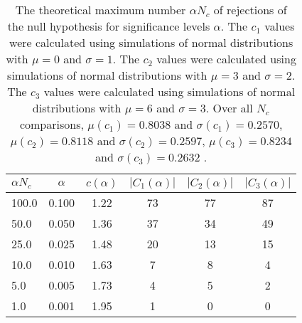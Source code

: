 \begin{table}[h!]
\begin{center}
\begin{tabular}{| l | c | c | c | c | c |}\hline
$\alpha N_c$ & $\alpha$ & $c(\alpha)$ & $|C_1(\alpha)|$ & $|C_2(\alpha)|$ & $|C_3(\alpha)|$ \\\hline
100.0 & 0.100 & 1.22 & 73 & 77 & 87 \\\hline
50.0 & 0.050 & 1.36 & 37 & 34 & 49 \\\hline
25.0 & 0.025 & 1.48 & 20 & 13 & 15 \\\hline
10.0 & 0.010 & 1.63 & 7 & 8 & 4 \\\hline
5.0 & 0.005 & 1.73 & 4 & 5 & 2 \\\hline
1.0 & 0.001 & 1.95 & 1 & 0 & 0 \\\hline
\end{tabular}
\caption{The theoretical maximum number $\alpha N_c$ of rejections
of the null hypothesis for significance levels $\alpha$.
The $c_1$ values were calculated using simulations of normal distributions with $\mu=0$ and $\sigma=1$.
The $c_2$ values were calculated using simulations of normal distributions with $\mu=3$ and $\sigma=2$.
The $c_3$ values were calculated using simulations of normal distributions with $\mu=6$ and $\sigma=3$.
Over all $N_c$ comparisons,
 $\mu(c_1)=0.8038$ and $\sigma(c_1)=0.2570$,
 $\mu(c_2)=0.8118$ and $\sigma(c_2)=0.2597$,
 $\mu(c_3)=0.8234$ and $\sigma(c_3)=0.2632$ .
}
\end{center}
\end{table}